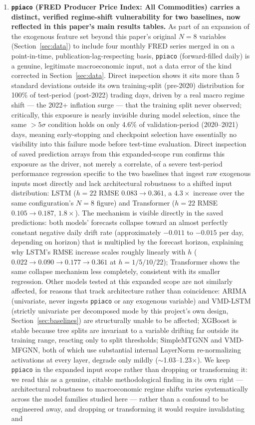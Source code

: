 \documentclass[journal]{IEEEtran}
\begin{document}
\begin{enumerate}
    \item \textbf{\texttt{ppiaco} (FRED Producer Price Index: All Commodities) carries a distinct, verified regime-shift vulnerability for two baselines, now reflected in this paper's main results tables.} As part of an expansion of the exogenous feature set beyond this paper's original $N=8$ variables (Section~\ref{sec:data}) to include four monthly FRED series merged in on a point-in-time, publication-lag-respecting basis, \texttt{ppiaco} (forward-filled daily) is a genuine, legitimate macroeconomic input, not a data error of the kind corrected in Section~\ref{sec:data}. Direct inspection shows it sits more than 5 standard deviations outside its own training-split (pre-2020) distribution for 100\% of test-period (post-2022) trading days, driven by a real macro regime shift --- the 2022+ inflation surge --- that the training split never observed; critically, this exposure is nearly invisible during model selection, since the same $>5\sigma$ condition holds on only 4.6\% of validation-period (2020--2021) days, meaning early-stopping and checkpoint selection have essentially no visibility into this failure mode before test-time evaluation. Direct inspection of saved prediction arrays from this expanded-scope run confirms this exposure as the driver, not merely a correlate, of a severe test-period performance regression specific to the two baselines that ingest raw exogenous inputs most directly and lack architectural robustness to a shifted input distribution: LSTM ($h=22$ RMSE $0.083\rightarrow0.361$, a $4.3\times$ increase over the same configuration's $N=8$ figure) and Transformer ($h=22$ RMSE $0.105\rightarrow0.187$, $1.8\times$). The mechanism is visible directly in the saved predictions: both models' forecasts collapse toward an almost perfectly constant negative daily drift rate (approximately $-0.011$ to $-0.015$ per day, depending on horizon) that is multiplied by the forecast horizon, explaining why LSTM's RMSE increase scales roughly linearly with $h$ ($0.022\rightarrow0.090\rightarrow0.177\rightarrow0.361$ at $h=1/5/10/22$); Transformer shows the same collapse mechanism less completely, consistent with its smaller regression. Other models tested at this expanded scope are not similarly affected, for reasons that track architecture rather than coincidence: ARIMA (univariate, never ingests \texttt{ppiaco} or any exogenous variable) and VMD-LSTM (strictly univariate per decomposed mode by this project's own design, Section~\ref{sec:baselines}) are structurally unable to be affected; XGBoost is stable because tree splits are invariant to a variable drifting far outside its training range, reacting only to split thresholds; SimpleMTGNN and VMD-MFGNN, both of which use substantial internal LayerNorm re-normalizing activations at every layer, degrade only mildly ($\sim$1.03--1.23$\times$). We keep \texttt{ppiaco} in the expanded input scope rather than dropping or transforming it: we read this as a genuine, citable methodological finding in its own right --- architectural robustness to macroeconomic regime shifts varies systematically across the model families studied here --- rather than a confound to be engineered away, and dropping or transforming it would require invalidating and 
\end{enumerate}
\end{document}
